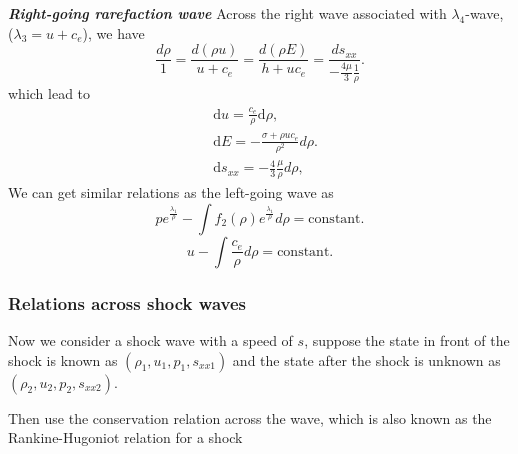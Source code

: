 \documentclass[review]{elsarticle}
\begin{document}
\emph{\textbf{Right-going rarefaction wave} }
Across the right wave associated with $\lambda_4$-wave, ($\lambda_3=u+c_e$), we have
\begin{equation}
  \frac{d\rho}{1} = \frac{d(\rho u)}{u+c_e} = \frac{d(\rho E)}{h+uc_e} = \frac{ds_{xx}}{-\frac{4\mu}{3}\frac{1}{\rho}}.
\end{equation}
which lead to 
\begin{align}
  \label{eq:urho}
  & \text{d} u =\frac{c_e}{\rho}\text{d}\rho,\\
 \label{eq:Erho}
  & \text{d} E = -\frac{\sigma+\rho u c_e}{\rho^2} d\rho.\\
\label{eq:sxxrho}
& \text{d} s_{xx} = -\frac{4}{3}\frac{\mu}{\rho} d\rho,
\end{align}
We can get  similar  relations  as the left-going wave as
\begin{equation}
  p e^{\frac{\lambda_1}{\rho}} - \int f_2(\rho) e^{\frac{\lambda_1}{\rho}}d\rho = \text{constant}.
\end{equation}
\begin{equation}
  u-\int\frac{c_e}{\rho} d\rho = \text{constant}.
\end{equation}

\subsubsection{Relations across  shock waves}\label{sec:shock}
Now we consider a shock wave with a speed of $s$, suppose the state in front of the shock is known as $(\rho_1,u_1,p_1,s_{xx1})$ and the state after the shock is unknown as $(\rho_2,u_2,p_2,s_{xx2})$. 

Then use the conservation relation across the wave, which is also known as the Rankine-Hugoniot relation for a shock 
\end{document}
